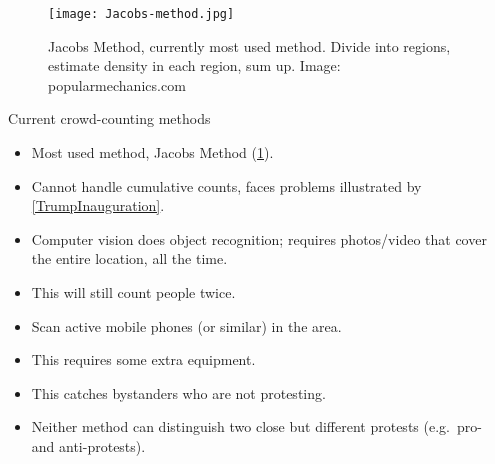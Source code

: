 \begin{columns}[t]

  \begin{column}{0.32\linewidth}

    \begin{figure}
      \centering
      \texttt{[image: Jacobs-method.jpg]}
      \caption{%
        Jacobs Method, currently most used method.
        Divide into regions, estimate density in each region, sum up.
        Image: popularmechanics.com
      }\label{JacobsMethod}
    \end{figure}

    \begin{purpleblock}{Current crowd-counting methods}
      \begin{itemize}
        \item Most used method, Jacobs Method (\cref{JacobsMethod}).
        \item {\color{red} Cannot handle cumulative counts, faces problems 
            illustrated by \cref{TrumpInauguration}.}
        \item Computer vision does object recognition; requires photos/video 
          that cover the entire location, all the time.
        \item {\color{red} This will still count people twice.}
        \item Scan active mobile phones (or similar) in the area.
        \item This requires some extra equipment.
        \item {\color{red} This catches bystanders who are not protesting.}
        \item {\color{red} Neither method can distinguish two close but 
            different protests (e.g.\ pro- and anti-protests).}
      \end{itemize}
    \end{purpleblock}


  \end{column}

  \hfill

  \begin{column}{0.32\linewidth}


\end{column}
\end{columns}

